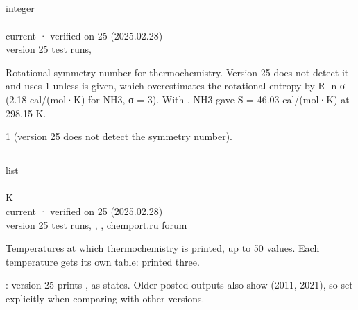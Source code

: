 \documentclass[letterpaper,10pt,english,openany,oneside]{sphinxmanual}
\begin{document}
\subsection{}
\label{\detokenize{reference/thermo:sigma}}\label{\detokenize{reference/thermo:thermo-sigma}}
\ignorespaces 
\sphinxAtStartPar
{} integer\\
 \\
 current · verified on 25 (2025.02.28)\\
 version 25 test runs, 

\sphinxAtStartPar
Rotational symmetry number for thermochemistry. Version 25 does not detect it and uses 1 unless  is
given, which overestimates the rotational entropy by R ln σ (2.18 cal/(mol·K) for NH3, σ = 3). With
, NH3 gave S = 46.03 cal/(mol·K) at 298.15 K.

\sphinxAtStartPar
{} 1 (version 25 does not detect the symmetry number).


\subsection{}
\label{\detokenize{reference/thermo:temperature}}\label{\detokenize{reference/thermo:thermo-temperature}}
\ignorespaces 
\sphinxAtStartPar
{} list\\
 \\
 K\\
 current · verified on 25 (2025.02.28)\\
 version 25 test runs, , , chemport.ru forum

\sphinxAtStartPar
Temperatures at which thermochemistry is printed, up to 50 values. Each temperature gets its own table:
 printed three.

\sphinxAtStartPar
{} : version 25 prints , as  states. Older posted outputs also show 
(2011, 2021), so set  explicitly when comparing with other versions.
\end{document}
